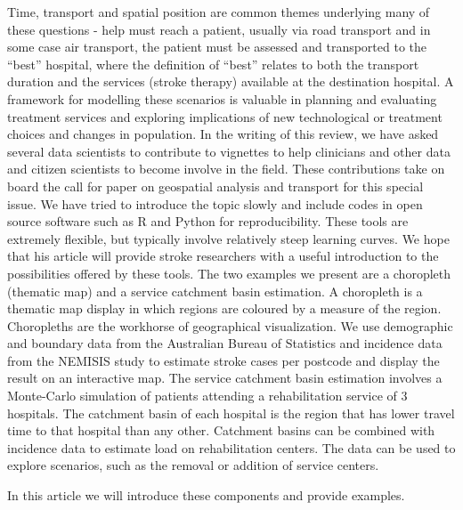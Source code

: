 \documentclass[utf8]{frontiersHLTH}
\begin{document}
Time, transport and spatial position are common themes underlying many
of these questions - help must reach a patient, usually via road
transport and in some case air transport, the patient must be assessed and transported to the
``best'' hospital, where the definition of ``best'' relates to both
the transport duration and the services (stroke therapy) available at
the destination hospital. A framework for modelling these scenarios is
valuable in planning and evaluating treatment services and exploring
implications of new technological or treatment choices and changes in
population. In the writing of this review, we have asked several data
scientists to contribute to vignettes to help clinicians and other
data and citizen scientists to become involve in the field. These
contributions take on board the call for paper on geospatial analysis
and transport for this special issue. We have tried to introduce the
topic slowly and include codes in open source software such as R and
Python for reproducibility. These tools are extremely flexible, but
typically involve relatively steep learning curves. We hope that his
article will provide stroke researchers with a useful introduction to
the possibilities offered by these tools. The two examples we present
are a choropleth (thematic map) and a service catchment
basin estimation. A choropleth is a thematic map display in which regions are
coloured by a measure of the region. Choropleths are the workhorse of
geographical visualization. We use demographic and boundary data from
the Australian Bureau of Statistics and incidence data from the
NEMISIS \cite{thrift_stroke_2000,azarpazhooh2008patterns} study to
estimate stroke cases per postcode and display the result on an
interactive map. The service catchment basin estimation involves a
Monte-Carlo simulation of patients attending a rehabilitation service
of 3 hospitals. The catchment basin of each hospital is the region
that has lower travel time to that hospital than any other.  Catchment
basins can be combined with incidence data to estimate load on
rehabilitation centers. The data can be used to explore scenarios,
such as the removal or addition of service centers.

In this article we will introduce these components and provide
examples.
\end{document}
